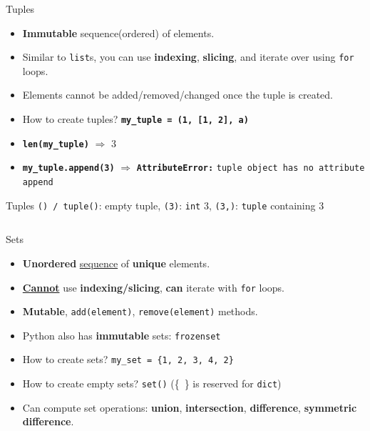     \begin{frame}{Tuples}
        \LARGE
        \begin{itemize}
            \item \textbf{Immutable} sequence(ordered) of elements.
            \item Similar to \texttt{list}s, you can use \textbf{indexing}, \textbf{slicing}, and iterate over using \texttt{for} loops.
            \item Elements cannot be added/removed/changed once the tuple is created.
            \item How to create tuples?
             \textbf{\texttt{my\_tuple = (1, [1, 2], \textquotesingle a\textquotesingle )}}
            \item \textbf{\texttt{len(my\_tuple)}} $\Rightarrow$
             3
            \item \textbf{\texttt{my\_tuple.append(3)}} $\Rightarrow$
             \textbf{\texttt{AttributeError:}} \texttt{\textquotesingle tuple\textquotesingle \ object has no attribute \textquotesingle append\textquotesingle}
        \end{itemize}
    \end{frame}

    \begin{frame}{Tuples}
        \LARGE
        \texttt{() / tuple()}: empty tuple, 
         \texttt{(3)}:
         \texttt{int} 3,
         \texttt{(3,)}:
         \texttt{tuple} containing 3
        \inputminted[frame=single,framesep=2pt]{python3}{../Lecture6/code-examples/tuples.py}
    \end{frame}

    \begin{frame}{Sets}
        \LARGE
        \begin{itemize}
            \item \textbf{Unordered} \underline{sequence} of \textbf{unique} elements.
            \pause
            \item \underline{\textbf{Cannot}} use \textbf{indexing/slicing}, \textbf{can} iterate with \texttt{for} loops.
            \pause
            \item \textbf{Mutable}, \texttt{add(element)}, \texttt{remove(element)} methods.
            \pause
            \item Python also has \textbf{immutable} sets: \texttt{frozenset}
            \pause
            \item How to create sets? 
            \pause
             \texttt{my\_set = \{1, 2, 3, 4, 2\}}
            \item How to create empty sets?
            \pause
             \texttt{set()} (\{\ \} is reserved for \texttt{dict})
            \pause
            \item Can compute set operations: \textbf{union}, \textbf{intersection}, \textbf{difference}, \textbf{symmetric difference}.
        \end{itemize}
    \end{frame}

